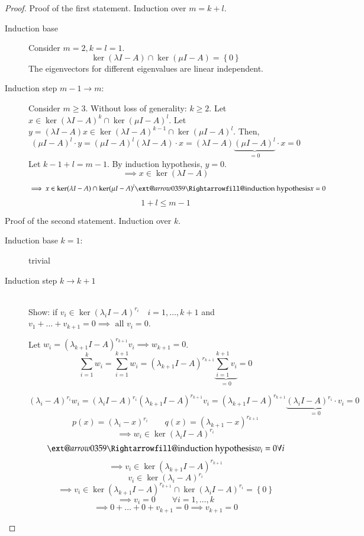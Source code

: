 \documentclass{article}
\makeatletter
\newcommand{\set}[1]{\left\{#1\right\}}
\newcommand{\xRightarrow}[2][]{\ext@arrow 0359\Rightarrowfill@{#1}{#2}}
\makeatother
\begin{document}
\begin{proof}
  Proof of the first statement. Induction over $m = k + l$.
  \begin{description}
    \item[Induction base] 
      Consider $m = 2, k = l = 1$.
      \[ \ker(\lambda I - A) \cap \ker(\mu I - A) = \set{0} \]
      The eigenvectors for different eigenvalues are linear independent.
    \item[Induction step $m-1 \to m$:]
      Consider $m \geq 3$. Without loss of generality: $k \geq 2$.
      Let $x \in \ker(\lambda I - A)^k \cap \ker(\mu I - A)^l$.
      Let $y = (\lambda I - A)x \in \ker(\lambda I - A)^{k-1} \cap \ker(\mu I - A)^l$. Then,
      \[ (\mu I - A)^l \cdot y = (\mu I - A)^l (\lambda I - A) \cdot x = (\lambda I - A) \underbrace{(\mu I - A)^l}_{=0} \cdot x = 0 \]
      Let $k - 1 + l = m - 1$.
      By induction hypothesis, $y = 0$.
      \[ \implies x \in \ker(\lambda I - A) \]
      \[ \implies x \in \ker(\lambda I - A) \cap \ker(\mu I - A)^l \xRightarrow{\text{induction hypothesis}} x = 0 \]
      \[ 1 + l \leq m - 1 \]
  \end{description}

  Proof of the second statement. Induction over $k$.
  \begin{description}
    \item[Induction base $k = 1$:] trivial
    \item[Induction step $k \to k+1$] \hfill{} \\
      Show: if $v_i \in \ker(\lambda_i I - A)^{r_i} \quad i = 1, \dots, k+1$ and $v_1 + \dots + v_{k+1} = 0
      \implies \text{ all } v_i = 0$.

      Let $w_i = (\lambda_{k+1} I - A)^{r_{k+1}} v_i \implies w_{k+1} = 0$.
      \[ \sum_{i=1}^k w_i = \sum_{i=1}^{k+1} w_i = (\lambda_{k+1} I - A)^{r_{k+1}} \underbrace{\sum_{i=1}^{k+1} v_i}_{=0} = 0 \]

      \[ (\lambda_i - A)^{r_i} w_i = (\lambda_i I - A)^{r_i} (\lambda_{k+1} I - A)^{r_{k+1}} v_i = (\lambda_{k+1} I - A)^{r_{k+1}} \underbrace{(\lambda_i I - A)^{r_i} \cdot v_i}_{=0} = 0 \]
      \[ p(x) = (\lambda_i - x)^{r_i} \qquad q(x) = (\lambda_{k+1} - x)^{r_{k+1}} \]
      \[ \implies w_i \in \ker(\lambda_i I - A)^{r_i} \]
      \[ \xRightarrow{\text{induction hypothesis}} w_i = 0 \forall i \]
      \[ \implies v_i \in \ker(\lambda_{k+1} I - A)^{r_{k+1}} \]
      \[ v_i \in \ker(\lambda_i - A)^{r_i} \]
      \[ \implies v_i \in \ker(\lambda_{k+1} I - A)^{r_{k+1}} \cap \ker(\lambda_i I - A)^{r_i} = \set{0} \]
      \[ \implies v_i = 0 \qquad \forall i = 1, \dots, k \]
      \[ \implies 0 + \dots + 0 + v_{k+1} = 0 \implies v_{k+1} = 0 \]
  \end{description}
\end{proof}
\end{document}
